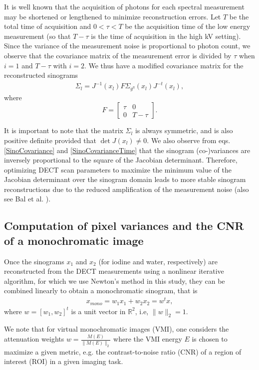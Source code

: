 \documentclass[12pt,twoside]{article}   %
\def\R{\mathbb{R}}
\def\S{\Sigma}
\begin{document}
It is well known that the acquisition of photons for each spectral measurement may be shortened or lengthened to minimize reconstruction errors. Let $T$ be the total time of acquisition and $0< \tau < T$ be the acquisition time of the low energy measurement (so that $T-\tau$ is the time of acquisition in the high kV setting). Since the variance of the measurement noise is proportional to photon count, we observe that the covariance matrix of the measurement error is divided by $\tau$ when $i=1$ and $T-\tau$ with $i=2$. We thus have a modified covariance matrix for the reconstructed sinograms
\begin{align}\label{SinoCovarianceTime}
 \textstyle \S_l = J^{-1}(x_l) F\S_{g^\eta}(x_l) J^{-t}(x_l),
\end{align}
where 
$$F=
\begin{bmatrix}
\tau & 0\\
0 & T-\tau
\end{bmatrix}.
$$

It is important to note that the matrix $\S_l$ is always symmetric, and is also positive definite provided that $\det J(x_l) \neq 0$. We also observe from eqs. \eqref{SinoCovariance} and \eqref{SinoCovarianceTime} that the sinogram (co-)variances are inversely proportional to the square of the Jacobian determinant. Therefore, optimizing DECT scan parameters to maximize the minimum value of the Jacobian determinant over the sinogram domain leads to more stable sinogram reconstructions due to the reduced amplification of the measurement noise (also see Bal et al. \cite{BalGongTer}).

\subsection{Computation of pixel variances and the CNR of a monochromatic image}
Once the sinograms $x_1$ and $x_2$ (for iodine and water, respectively) are reconstructed from the DECT measurements using a nonlinear iterative algorithm, for which we use Newton's method in this study, they can be combined linearly to obtain a monochromatic sinogram, that is 
\begin{align}\label{xmono}
    x_{mono} = w_1x_1+w_2x_2 = w^tx,
\end{align}
where $w=[w_1,w_2]^t$ is a unit vector in $\R^2$, i.e, $\|w\|_2=1$.

 We note that for virtual monochromatic images (VMI), one considers the attenuation weights $w = \frac{M(E)}{\|M(E)\|_2}$ where the VMI energy $E$ is chosen to maximize a given metric, e.g. the contrast-to-noise ratio (CNR) of a region of interest (ROI) in a given imaging task.
\end{document}
